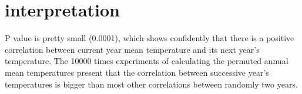 \documentclass[12pt]{article}
\begin{document}
  \section{interpretation}
    P value is pretty small (0.0001), which shows confidently that there is a positive correlation between current year mean temperature and its next year's temperature. The 10000 times experiments of calculating the permuted annual mean temperatures present that the correlation between successive year's temperatures is bigger than most other correlations between randomly two years.
\end{document}
